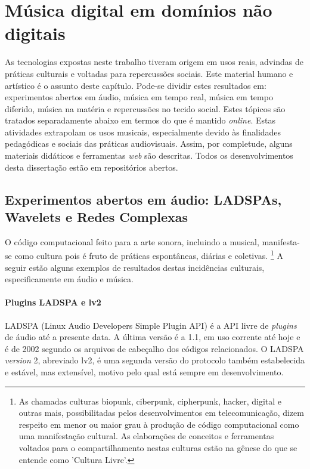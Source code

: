 \chapter{Música digital em domínios não digitais}
\label{cap:musicaExtra}

As tecnologias expostas neste trabalho tiveram origem em
usos reais, advindas
de práticas culturais e voltadas para repercussões sociais.
Este material humano e artístico é o assunto deste
capítulo.
Pode-se dividir estes resultados em:
experimentos abertos em áudio,
música em tempo real,
música em tempo diferido,
música na matéria e
repercussões no tecido social.
Estes tópicos são tratados separadamente
abaixo em termos do que é
mantido \emph{online}.
Estas atividades extrapolam os usos musicais, especialmente devido às
finalidades pedagódicas e sociais das práticas audiovisuais.
Assim, por completude, alguns materiais didáticos
e ferramentas \emph{web} são descritas.
Todos os desenvolvimentos desta dissertação estão em repositórios
abertos.\cite{repoDissertacao}

\section{Experimentos abertos em áudio: LADSPAs, Wavelets e Redes Complexas}


O código computacional feito para a arte sonora, incluindo a musical,
 manifesta-se como cultura pois é fruto de práticas
espontâneas, diárias e coletivas.
\footnote{As chamadas culturas biopunk, ciberpunk, cipherpunk, hacker,
  digital e outras mais, possibilitadas pelos desenvolvimentos
  em telecomunicação, dizem respeito em menor ou maior grau à produção
  de código computacional como uma manifestação cultural. As elaborações de conceitos e ferramentas
  voltados para o compartilhamento nestas culturas estão na gênese do que
  se entende como 'Cultura Livre'.}
A seguir estão alguns exemplos de resultados
destas incidências culturais,
especificamente em áudio
 e música.

\subsubsection{Plugins LADSPA e lv2}

LADSPA (Linux Audio Developers Simple Plugin API) é a API
livre de \emph{plugins} de áudio até a presente data. A
última versão é a 1.1, em uso corrente até hoje e é
de 2002 segundo os arquivos de cabeçalho dos códigos relacionados.
O LADSPA \emph{version} 2, abreviado lv2, é uma segunda versão do
protocolo também estabelecida e estável, mas extensível, motivo pelo
qual está sempre em desenvolvimento.

